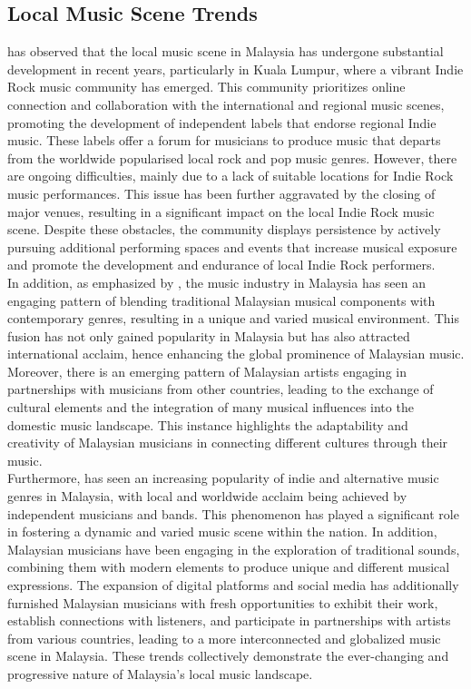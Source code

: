 \subsection{Local Music Scene Trends}
\textcite{ong19} has observed that the local music scene in Malaysia has undergone substantial development in recent years, particularly in Kuala Lumpur, where a vibrant Indie Rock music community has emerged. This community prioritizes online connection and collaboration with the international and regional music scenes, promoting the development of independent labels that endorse regional Indie music. These labels offer a forum for musicians to produce music that departs from the worldwide popularised local rock and pop music genres. However, there are ongoing difficulties, mainly due to a lack of suitable locations for Indie Rock music performances. This issue has been further aggravated by the closing of major venues, resulting in a significant impact on the local Indie Rock music scene. Despite these obstacles, the community displays persistence by actively pursuing additional performing spaces and events that increase musical exposure and promote the development and endurance of local Indie Rock performers. \\

In addition, as emphasized by \textcite{mohd21}, the music industry in Malaysia has seen an engaging pattern of blending traditional Malaysian musical components with contemporary genres, resulting in a unique and varied musical environment. This fusion has not only gained popularity in Malaysia but has also attracted international acclaim, hence enhancing the global prominence of Malaysian music. Moreover, there is an emerging pattern of Malaysian artists engaging in partnerships with musicians from other countries, leading to the exchange of cultural elements and the integration of many musical influences into the domestic music landscape. This instance highlights the adaptability and creativity of Malaysian musicians in connecting different cultures through their music. \\

Furthermore, \textcite{silahudin19} has seen an increasing popularity of indie and alternative music genres in Malaysia, with local and worldwide acclaim being achieved by independent musicians and bands. This phenomenon has played a significant role in fostering a dynamic and varied music scene within the nation. In addition, Malaysian musicians have been engaging in the exploration of traditional sounds, combining them with modern elements to produce unique and different musical expressions. The expansion of digital platforms and social media has additionally furnished Malaysian musicians with fresh opportunities to exhibit their work, establish connections with listeners, and participate in partnerships with artists from various countries, leading to a more interconnected and globalized music scene in Malaysia. These trends collectively demonstrate the ever-changing and progressive nature of Malaysia's local music landscape.


